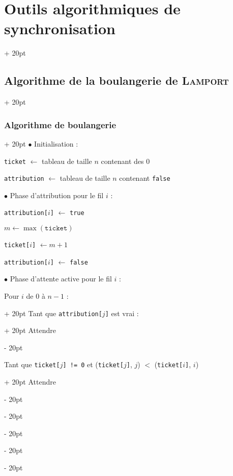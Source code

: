 \documentclass[a4paper, 12pt, twoside]{article}
\newcommand{\ind}[1][20pt]{\advance\leftskip + #1}
\newcommand{\deind}[1][20pt]{\advance\leftskip - #1}
\newenvironment{indt}[2][20pt]{#2 \par \ind[#1]}{\par \deind} %
\begin{document}
\begin{indt}{\section{Outils algorithmiques de synchronisation}}
\begin{indt}{\subsection{Algorithme de la boulangerie de \textsc{Lamport}}}
\begin{indt}{\subsubsection{Algorithme de boulangerie}}
                $\bullet$ Initialisation :

                \begin{pseudocode}
                    \texttt{ticket} $\leftarrow$ tableau de taille $n$ contenant des 0

                    \texttt{attribution} $\leftarrow$ tableau de taille $n$ contenant \texttt{false}
                \end{pseudocode}

                \vspace{6pt}
                
                $\bullet$ Phase d'attribution pour le fil $i$ :

                \begin{pseudocode}
                    \texttt{attribution[$i$]} $\leftarrow$ \texttt{true}

                    $m \leftarrow \max(\mathtt{ticket})$

                    \texttt{ticket[$i$]} $\leftarrow m + 1$

                    \texttt{attribution[$i$]} $\leftarrow$ \texttt{false}
                \end{pseudocode}

                \vspace{6pt}
                
                $\bullet$ Phase d'attente active pour le fil $i$ :

                \begin{pseudocode}
                    \begin{indt}{Pour $i$ de 0 à $n - 1$ :}
                        \begin{indt}{Tant que \texttt{attribution[$j$]} est vrai :}
                            Attendre
                        \end{indt}

                        \vspace{6pt}
                        
                        \begin{indt}{Tant que \texttt{ticket[$j$] != 0} et (\texttt{ticket[$j$]}, $j$) $<$ (\texttt{ticket[$i$]}, $i$)}
                            Attendre
                        \end{indt}
                    \end{indt}
                \end{pseudocode}


\end{indt}
\end{indt}
\end{indt}
\end{document}
